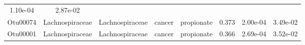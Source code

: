 \documentclass[11pt,]{article}
\begin{document}
\begin{longtable}[]{@{}cccccccc@{}}
\begin{minipage}[t]{0.08\columnwidth}
1.10e-04\strut
\end{minipage} & \begin{minipage}[t]{0.08\columnwidth}\centering\strut
2.87e-02\strut
\end{minipage}\tabularnewline
\begin{minipage}[t]{0.08\columnwidth}\centering\strut
Otu00074\strut
\end{minipage} & \begin{minipage}[t]{0.15\columnwidth}\centering\strut
Lachnospiraceae\strut
\end{minipage} & \begin{minipage}[t]{0.15\columnwidth}\centering\strut
Lachnospiraceae\strut
\end{minipage} & \begin{minipage}[t]{0.08\columnwidth}\centering\strut
cancer\strut
\end{minipage} & \begin{minipage}[t]{0.09\columnwidth}\centering\strut
propionate\strut
\end{minipage} & \begin{minipage}[t]{0.07\columnwidth}\centering\strut
0.373\strut
\end{minipage} & \begin{minipage}[t]{0.08\columnwidth}\centering\strut
2.00e-04\strut
\end{minipage} & \begin{minipage}[t]{0.08\columnwidth}\centering\strut
3.49e-02\strut
\end{minipage}\tabularnewline
\begin{minipage}[t]{0.08\columnwidth}\centering\strut
Otu00001\strut
\end{minipage} & \begin{minipage}[t]{0.15\columnwidth}\centering\strut
Lachnospiraceae\strut
\end{minipage} & \begin{minipage}[t]{0.15\columnwidth}\centering\strut
Lachnospiraceae\strut
\end{minipage} & \begin{minipage}[t]{0.08\columnwidth}\centering\strut
cancer\strut
\end{minipage} & \begin{minipage}[t]{0.09\columnwidth}\centering\strut
propionate\strut
\end{minipage} & \begin{minipage}[t]{0.07\columnwidth}\centering\strut
0.366\strut
\end{minipage} & \begin{minipage}[t]{0.08\columnwidth}\centering\strut
2.69e-04\strut
\end{minipage} & \begin{minipage}[t]{0.08\columnwidth}\centering\strut
3.52e-02\strut
\end{minipage}\tabularnewline
\bottomrule
\end{longtable}
\end{document}
